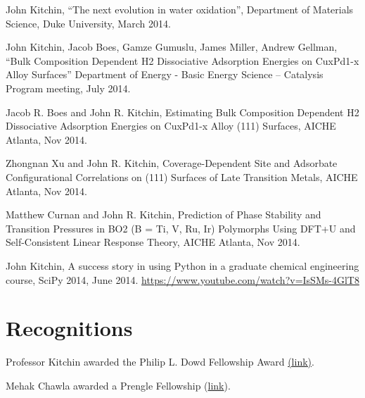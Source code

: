 \documentclass[aps,prb,citeautoscript,preprint,citeautoscript,showkeys]{revtex4-1}
\begin{document}
John Kitchin, “The next evolution in water oxidation”, Department of Materials Science, Duke University, March 2014.

John Kitchin, Jacob Boes, Gamze Gumuslu, James Miller, Andrew Gellman, “Bulk Composition Dependent H2 Dissociative Adsorption Energies on CuxPd1-x Alloy Surfaces” Department of Energy - Basic Energy Science – Catalysis Program meeting, July 2014.

Jacob R. Boes and John R. Kitchin, Estimating Bulk Composition Dependent H2 Dissociative Adsorption Energies on CuxPd1-x Alloy (111) Surfaces, AICHE Atlanta, Nov 2014.

Zhongnan Xu and John R. Kitchin, Coverage-Dependent Site and Adsorbate Configurational Correlations on (111) Surfaces of Late Transition Metals, AICHE Atlanta, Nov 2014.

Matthew Curnan and John R. Kitchin, Prediction of Phase Stability and Transition Pressures in BO2 (B = Ti, V, Ru, Ir) Polymorphs Using DFT+U and Self-Consistent Linear Response Theory, AICHE Atlanta, Nov 2014.

John Kitchin, A success story in using Python in a graduate chemical engineering course, SciPy 2014, June 2014.  \url{https://www.youtube.com/watch?v=IsSMs-4GlT8} 

\section{Recognitions}
\label{sec-4}
Professor Kitchin awarded the Philip L. Dowd Fellowship Award \href{http://kitchingroup.cheme.cmu.edu/blog/2014/02/28/Professor-Kitchin-awarded-the-Philip-L-Dowd-Fellowship-Award/}{(link)}.

Mehak Chawla awarded a Prengle Fellowship (\href{http://kitchingroup.cheme.cmu.edu/blog/2014/03/24/Mehak-Chawla-selected-as-the-H-William-and-Ruth-Hamilton-Prengle-Fellow-of-Chemical-Enginering-for-2013-2014/}{link}).
\end{document}
